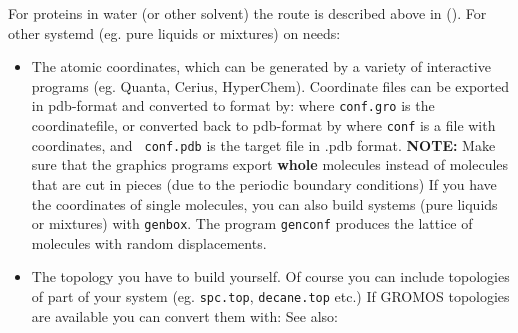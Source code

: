 For proteins in water (or other solvent) the route is described above in (). For other systemd (eg. pure liquids or mixtures) on needs:
\begin{itemize} 
\item 	The atomic coordinates, which can be generated by a variety of 
	interactive programs (eg. Quanta, Cerius, HyperChem). 
	Coordinate files can be exported in pdb-format and 
	converted to {\gromacs} format by:
	where {\tt conf.gro} is the {\gromacs} coordinatefile, 
	or converted back to pdb-format by
	where {\tt conf} is a file with {\gromacs} coordinates, and {\tt
	conf.pdb} is the target file in .pdb format.
	{\bf NOTE:} Make sure that the graphics programs export 
	{\bf whole} molecules instead of molecules that are cut in pieces
	(due to the periodic boundary conditions)
	If you have the coordinates of single molecules, you can also 
	build systems (pure liquids or mixtures) with {\tt genbox}.
	The program {\tt genconf} produces the lattice of molecules 
	with random displacements.
\item 	The topology you have to build yourself. Of course you can 
	include topologies of part of your system (eg. {\tt spc.top}, 
	{\tt decane.top} etc.) If GROMOS topologies are available you 
	can convert them with:
	See also:
\end{itemize}

